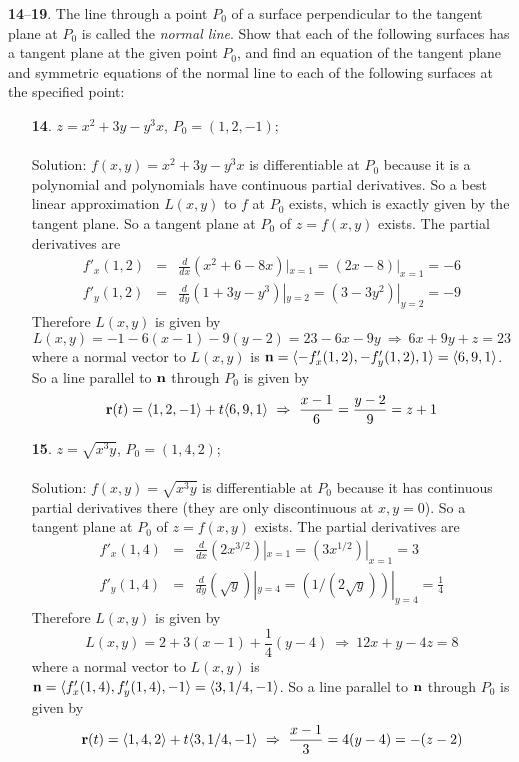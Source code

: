 \documentclass[12pt]{amsbook}
\newcommand{\la}{\langle}
\newcommand{\ra}{\rangle}
\begin{document}
\noindent
{\small {\bf 14}--{\bf 19}}. The line through a point $P_0$ of a surface perpendicular to the tangent
plane at $P_0$ is called the {\it normal line}. Show that each of the following surfaces has a tangent plane at the given point $P_0$, and find an equation of the tangent plane and symmetric equations of the normal line to each of the following surfaces at the specified point:
\begin{enumerate}
\item[{\small\bf 14}.] $z=x^2+3y-y^3x$, $P_0=(1,2,-1)$;
\\
\\
{\sc Solution}: $f(x,y)=x^2+3y-y^3x$ is differentiable at $P_0$ because it is a polynomial and polynomials have continuous partial derivatives. So a best linear approximation $L(x,y)$ to $f$ at $P_0$ exists, which is exactly given by the tangent plane. So a tangent plane at $P_0$ of $z=f(x,y)$ exists. The partial derivatives are
\begin{eqnarray*}
f'_x(1,2)&=&\frac{d}{dx}(x^2+6-8x)|_{x=1}=(2x-8)|_{x=1}=-6 \\
f'_y(1,2)&=&\frac{d}{dy}(1+3y-y^3)|_{y=2}=(3-3y^2)|_{y=2}=-9
\end{eqnarray*}
Therefore $L(x,y)$ is given by
$$L(x,y)=-1-6(x-1)-9(y-2)=23-6x-9y \ \Rightarrow \ 6x+9y+z=23$$
where a normal vector to $L(x,y)$ is ${\bf n}=\la -f'_x(1,2),-f'_y(1,2),1 \ra = \la 6,9,1 \ra$.
So a line parallel to ${\bf n}$ through $P_0$ is given by
$${\bf r}(t)=\la 1,2,-1 \ra +t \la 6,9,1 \ra \ \Rightarrow \ \frac{x-1}{6}=\frac{y-2}{9}=z+1$$
\item[{\small\bf 15}.] $z=\sqrt{x^3y}$, $P_0=(1,4,2)$;
\\
\\
{\sc Solution}: $f(x,y)=\sqrt{x^3y}$ is differentiable at $P_0$ because it has continuous partial derivatives there (they are only discontinuous at $x,y=0$). So a tangent plane at $P_0$ of $z=f(x,y)$ exists. The partial derivatives are
\begin{eqnarray*}
f'_x(1,4)&=&\frac{d}{dx}(2x^{3/2})|_{x=1}=(3x^{1/2})|_{x=1}=3 \\
f'_y(1,4)&=&\frac{d}{dy}(\sqrt{y})|_{y=4}=(1/(2\sqrt{y}))|_{y=4}=\frac{1}{4}
\end{eqnarray*}
Therefore $L(x,y)$ is given by
$$L(x,y)=2+3(x-1)+\frac{1}{4}(y-4) \ \Rightarrow \ 12x+y-4z=8$$
where a normal vector to $L(x,y)$ is ${\bf n}=\la f'_x(1,4),f'_y(1,4),-1 \ra = \la 3,1/4,-1 \ra$.
So a line parallel to ${\bf n}$ through $P_0$ is given by
$${\bf r}(t)=\la 1,4,2 \ra +t \la 3,1/4,-1 \ra \ \Rightarrow \ \frac{x-1}{3}=4(y-4)=-(z-2)$$

\end{enumerate}
\end{document}
